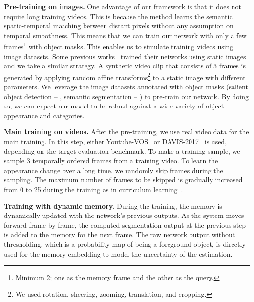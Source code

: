 \documentclass[10pt,twocolumn,letterpaper]{article}
\renewcommand{\paragraph}[1]{\vspace{1mm}\noindent\textbf{#1}}
\begin{document}
\paragraph{Pre-training on images.}
One advantage of our framework is that it does not require long training videos.
This is because the method learns the semantic spatio-temporal matching between distant pixels without any assumption on temporal smoothness. 
This means that we can train our network with only a few frames\footnote{Minimum 2; one as the memory frame and the other as the query.} with object masks. 
This enables us to simulate training videos using image datasets.
Some previous works~\cite{perazzi2017learning, oh2018fast} trained their networks using static images and we take a similar strategy.
A synthetic video clip that consists of 3 frames is generated by applying random affine transforms\footnote{We used rotation, sheering, zooming, translation, and cropping.} to a static image with different parameters.
We leverage the image datasets annotated with object masks (salient object detection -- \cite{shi2016hierarchical, cheng2015global}, semantic segmentation -- \cite{everingham2010pascal, hariharan2011semantic, lin2014microsoft}) to pre-train our network. 
By doing so, we can expect our model to be robust against a wide variety of object appearance and categories. 

\paragraph{Main training on videos.} 
After the pre-training, we use real video data for the main training. 
In this step, either Youtube-VOS~\cite{xu2018youtube} or DAVIS-2017~\cite{Pont-Tuset_arXiv_2017} is used, depending on the target evaluation benchmark.
To make a training sample, we sample 3 temporally ordered frames from a training video. 
To learn the appearance change over a long time, we randomly skip frames during the sampling. 
The maximum number of frames to be skipped is gradually increased from 0 to 25 during the training as in curriculum learning~\cite{yang2015weakly}. 

\paragraph{Training with dynamic memory.}
During the training, the memory is dynamically updated with the network's previous outputs.
As the system moves forward frame-by-frame, the computed segmentation output at the previous step is added to the memory for the next frame.
The raw network output without thresholding, which is a probability map of being a foreground object, is directly used for the memory embedding to model the uncertainty of the estimation.
\end{document}
